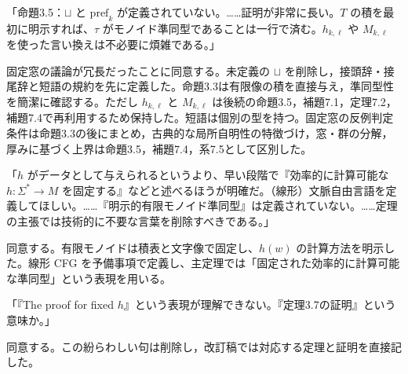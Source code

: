 「命題3.5：$\sqcup$ と $\mathrm{pref}_k$ が定義されていない。……証明が非常に長い。$T$ の積を最初に明示すれば、$\tau$ がモノイド準同型であることは一行で済む。$h_{k,\ell}$ や $M_{k,\ell}$ を使った言い換えは不必要に煩雑である。」

\Reply
固定窓の議論が冗長だったことに同意する。未定義の $\sqcup$ を削除し，接頭辞・接尾辞と短語の規約を先に定義した。命題3.3は有限像の積を直接与え，準同型性を簡潔に確認する。ただし $h_{k,\ell}$ と $M_{k,\ell}$ は後続の命題3.5，補題7.1，定理7.2，補題7.4で再利用するため保持した。短語は個別の型を持つ。固定窓の反例判定条件は命題3.3の後にまとめ，古典的な局所自明性の特徴づけ，窓・群の分解，厚みに基づく上界は命題3.5，補題7.4，系7.5として区別した。

「$h$ がデータとして与えられるというより、早い段階で『効率的に計算可能な $h:\Sigma^*\to M$ を固定する』などと述べるほうが明確だ。（線形）文脈自由言語を定義してほしい。……『明示的有限モノイド準同型』は定義されていない。……定理の主張では技術的に不要な言葉を削除すべきである。」

\Reply
同意する。有限モノイドは積表と文字像で固定し、$h(w)$ の計算方法を明示した。線形 CFG を予備事項で定義し、主定理では「固定された効率的に計算可能な準同型」という表現を用いる。

「『The proof for fixed $h$』という表現が理解できない。『定理3.7の証明』という意味か。」

\Reply
同意する。この紛らわしい句は削除し，改訂稿では対応する定理と証明を直接記した。
